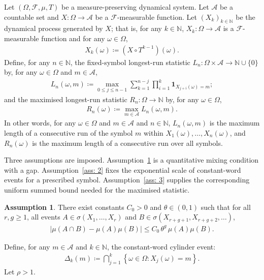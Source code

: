\documentclass[12pt,reqno]{amsart}
\theoremstyle{definition}
\newtheorem{assumption}{Assumption}
\theoremstyle{plain}
\begin{document}
Let $(\Omega,\mathcal F,\mu,T)$ be a measure-preserving dynamical system. Let $\mathcal{A}$ be a countable set and $X:\Omega\to\mathcal{A}$ be a $\mathcal{F}$-measurable function. Let $(X_k)_{k\in\mathbb{N}}$ be the dynamical process generated by $X$; that is, for any $k\in\mathbb{N}$, $X_k:\Omega\to\mathcal{A}$ is a $\mathcal{F}$-measurable function and for any $\omega\in\Omega$, 
\begin{align*}
    X_k(\omega)\coloneqq\left(X\circ T^{k-1}\right)(\omega).
\end{align*}
Define, for any $n\in\mathbb{N}$, the fixed-symbol longest-run statistic $L_n:\Omega\times\mathcal{A}\to\mathbb{N}\cup\{0\}$ by, for any $\omega\in\Omega$ and $m\in\mathcal{A}$,
\begin{align*}
    L_n(\omega,m)
    \coloneqq\max_{0\leq j\leq n-1}\sum_{k=1}^{n-j}\prod_{i=1}^k\mathbf{1}_{X_{j+i}(\omega)=m};
\end{align*}
and the maximised longest-run statistic $R_n:\Omega\to\mathbb{N}$ by, for any $\omega\in\Omega$,  
\begin{align*}
    R_n(\omega)\coloneqq \max_{m\in\mathcal{A}} L_n(\omega,m).
\end{align*}
In other words, for any $\omega\in\Omega$ and $m\in\mathcal{A}$ and $n\in\mathbb{N}$, $L_n(\omega,m)$ is the maximum length of a consecutive run of the symbol $m$ within $X_1(\omega),\dots,X_n(\omega)$, and $R_n(\omega)$ is the maximum length of a consecutive run over all symbols. 

Three assumptions are imposed. Assumption~\ref{ass: 1} is a quantitative mixing condition with a gap. Assumption~\ref{ass: 2} fixes the exponential scale of constant-word events for a prescribed symbol. Assumption~\ref{ass: 3} supplies the corresponding uniform summed bound needed for the maximised statistic.

\begin{assumption}\label{ass: 1}
There exist constants $C_0>0$ and $\theta\in(0,1)$ such that for all $r,g\ge1$, all
events $A\in\sigma(X_1,\dots,X_r)$ and
$B\in\sigma(X_{r+g+1},X_{r+g+2},\dots)$,
\begin{align}\label{eq: ass 1}
    \left|\mu(A\cap B)-\mu(A)\mu(B)\right|
    \leq C_0\,\theta^{g}\,\mu(A)\mu(B).
\end{align}
\end{assumption}

Define, for any $m\in\mathcal{A}$ and $k\in\mathbb{N}$, the constant-word cylinder event:
\begin{align*}
    \Delta_k{\left(m\right)}
    \coloneqq \bigcap_{j=1}^k\left\{\omega\in\Omega: X_j(\omega)=m\right\}.
\end{align*}
Let $\rho>1$.
\end{document}
